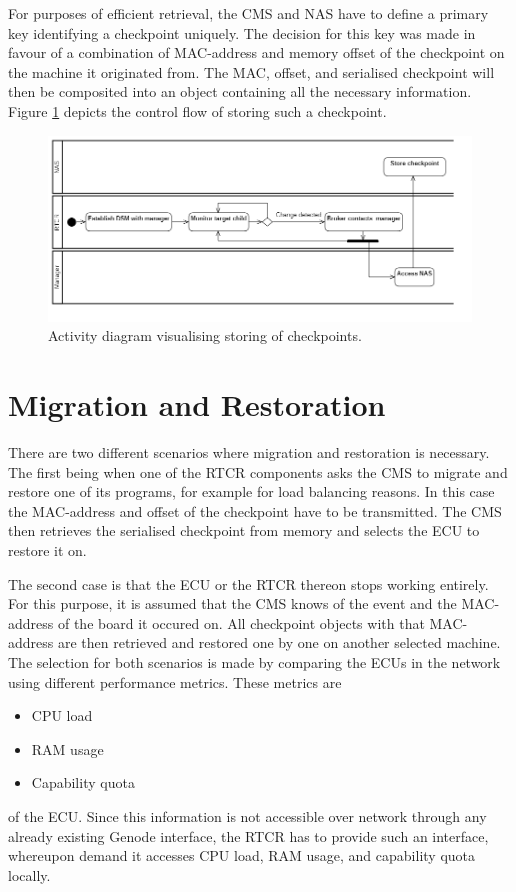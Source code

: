 For purposes of efficient retrieval, the CMS and NAS have to define a primary key identifying a checkpoint uniquely. The decision for this key was made in favour of a combination of MAC-address and memory offset of the checkpoint on the machine it originated from. The MAC, offset, and serialised checkpoint will then be composited into an object containing all the necessary information. Figure \ref{fig:store_activity} depicts the control flow of storing such a checkpoint.
\begin{figure}
    \centering
    \includegraphics[width=\textwidth]{Images/checkpoint-storing_activity.png}
    \caption{Activity diagram visualising storing of checkpoints.}
    \label{fig:store_activity}
\end{figure}
\section{Migration and Restoration}\label{section:Migration_and_Restoration}
There are two different scenarios where migration and restoration is necessary. The first being when one of the RTCR components asks the CMS to migrate and restore one of its programs, for example for load balancing reasons. In this case the MAC-address and offset of the checkpoint have to be transmitted. The CMS then retrieves the serialised checkpoint from memory and selects the ECU to restore it on.

The second case is that the ECU or the RTCR thereon stops working entirely. For this purpose, it is assumed that the CMS knows of the event and the MAC-address of the board it occured on. All checkpoint objects with that MAC-address are then retrieved and restored one by one on another selected machine.
The selection for both scenarios is made by comparing the ECUs in the network using different performance metrics. These metrics are
\begin{itemize}
    \item CPU load
    \item RAM usage
    \item Capability quota
\end{itemize}
of the ECU. Since this information is not accessible over network through any already existing Genode interface, the RTCR has to provide such an interface, whereupon demand it accesses CPU load, RAM usage, and capability quota locally.

